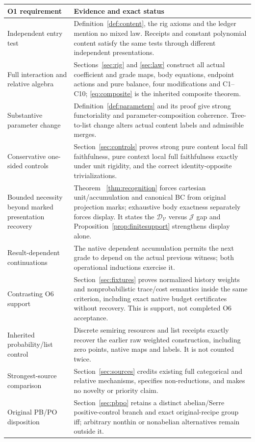 \documentclass[11pt,a4paper]{article}
\theoremstyle{definition}
\newcommand{\V}{\mathcal V}
\newcommand{\J}{\mathcal J}
\newcommand{\D}{\mathcal D_{\V}}
\begin{document}
\begin{longtable}{@{}p{.29\linewidth}p{.65\linewidth}@{}}
\toprule
O1 requirement&Evidence and exact status\\
\midrule\endhead
Independent entry test&Definition~\ref{def:content}, the rig axioms and the
ledger mention no mixed law. Receipts and constant polynomial content satisfy
the same tests through different independent presentations.\\
Full interaction and relative algebra&Sections~\ref{sec:rig} and
\ref{sec:law} construct all actual coefficient and grade maps, body equations,
endpoint actions and pure balance, four modifications and C1--C10;
\eqref{eq:composite} is the inherited composite theorem.\\
Substantive parameter change&Definition~\ref{def:parameters} and its proof
give strong functoriality and parameter-composition coherence. Tree-to-list
change alters actual content labels and admissible merges.\\
Conservative one-sided controls&Section~\ref{sec:controls} proves strong pure
content local full faithfulness, pure context local full faithfulness exactly
under unit rigidity, and the correct identity-opposite trivializations.\\
Bounded necessity beyond marked presentation recovery&Theorem
~\ref{thm:recognition} forces cartesian unit/accumulation and canonical BC
from original projection marks; exhaustive body exactness separately forces
display. It states the $\D$ versus $\J$ gap and
Proposition~\ref{prop:finitesupport} strengthens display alone.\\
Result-dependent continuations&The native dependent accumulation permits the
next grade to depend on the actual previous witness; both operational
inductions exercise it.\\
Contrasting O6 support&Section~\ref{sec:fixtures} proves normalized history
weights and nonprobabilistic trace/cost semantics inside the same criterion,
including exact native budget certificates without recovery. This is support,
not completed O6 acceptance.\\
Inherited probability/list control&Discrete semiring resources and list
receipts exactly recover the earlier raw weighted construction, including
zero points, native maps and labels. It is not counted twice.\\
Strongest-source comparison&Section~\ref{sec:sources} credits existing full
categorical and relative mechanisms, specifies non-reductions, and makes no
novelty or priority claim.\\
Original PB/PO disposition&Section~\ref{sec:pbpo} retains a distinct
abelian/Serre positive-control branch and exact original-recipe group iff;
arbitrary nonthin or nonabelian alternatives remain outside it.\\
\bottomrule
\end{longtable}
\end{document}
